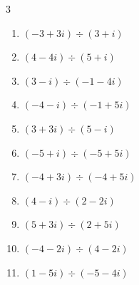 \begin{multicols}{3}
\begin{enumerate}

  \item $\displaystyle (-3+3i)\div(3+i)$


  \item $\displaystyle (4-4i)\div(5+i)$


\columnbreak %

  \item $\displaystyle (3-i)\div(-1-4i)$


  \item $\displaystyle (-4-i)\div(-1+5i)$


  \item $\displaystyle (3+3i)\div(5-i)$


  \item $\displaystyle (-5+i)\div(-5+5i)$


  \item $\displaystyle (-4+3i)\div(-4+5i)$


  \item $\displaystyle (4-i)\div(2-2i)$


  \item $\displaystyle (5+3i)\div(2+5i)$


  \item $\displaystyle (-4-2i)\div(4-2i)$


  \item $\displaystyle (1-5i)\div(-5-4i)$



\end{enumerate}
\end{multicols}
